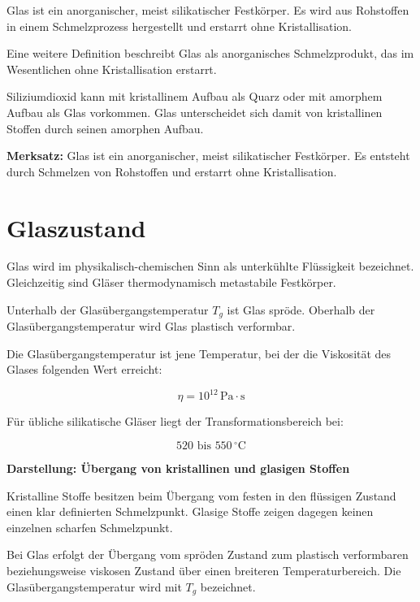 \documentclass[
  12pt,
  a4paper,
  oneside
]{scrreprt}
\begin{document}
Glas ist ein anorganischer, meist silikatischer Festkörper. Es wird aus
Rohstoffen in einem Schmelzprozess hergestellt und erstarrt ohne
Kristallisation. 

Eine weitere Definition beschreibt Glas als anorganisches
Schmelzprodukt, das im Wesentlichen ohne Kristallisation erstarrt.


Siliziumdioxid kann mit kristallinem Aufbau als Quarz oder mit amorphem
Aufbau als Glas vorkommen. Glas unterscheidet sich damit von
kristallinen Stoffen durch seinen amorphen Aufbau. 

\begin{merksatzbox}
\textbf{Merksatz:}
Glas ist ein anorganischer, meist silikatischer Festkörper. Es entsteht
durch Schmelzen von Rohstoffen und erstarrt ohne Kristallisation.

\end{merksatzbox}

\section{Glaszustand}

Glas wird im physikalisch-chemischen Sinn als unterkühlte Flüssigkeit
bezeichnet. Gleichzeitig sind Gläser thermodynamisch metastabile
Festkörper. 

Unterhalb der Glasübergangstemperatur $T_g$ ist Glas spröde. Oberhalb
der Glasübergangstemperatur wird Glas plastisch verformbar.


Die Glasübergangstemperatur ist jene Temperatur, bei der die Viskosität
des Glases folgenden Wert erreicht:

\begin{equation}
  \eta = 10^{12}\,\mathrm{Pa \cdot s}
\end{equation}

Für übliche silikatische Gläser liegt der Transformationsbereich bei:

\begin{equation}
  520 \text{ bis } 550\,^\circ\mathrm{C}
\end{equation}



\begin{darstellungsbox}
\textbf{Darstellung: Übergang von kristallinen und glasigen Stoffen}

Kristalline Stoffe besitzen beim Übergang vom festen in den flüssigen
Zustand einen klar definierten Schmelzpunkt. Glasige Stoffe zeigen
dagegen keinen einzelnen scharfen Schmelzpunkt.

Bei Glas erfolgt der Übergang vom spröden Zustand zum plastisch
verformbaren beziehungsweise viskosen Zustand über einen breiteren
Temperaturbereich. Die Glasübergangstemperatur wird mit $T_g$
bezeichnet.
\end{darstellungsbox}
\end{document}
